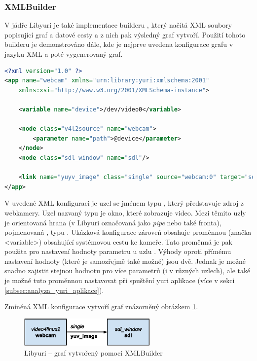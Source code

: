 \documentclass[thesis=M,czech]{FITthesis}[2012/06/26]
\begin{document}
\subsubsection{XMLBuilder} \label{subsec:analyza_yuri_vytvoreni_xml}
V jádře Libyuri je také implementace builderu , který načítá XML soubory popisující graf a datové cesty a z nich pak výsledný graf vytvoří. Použití tohoto builderu je demonstrováno dále, kde je nejprve uvedena konfigurace grafu v jazyku XML a poté vygenerovaný graf.
\\
\begin{minipage}{\linewidth}
\begin{lstlisting}[language=XML]
<?xml version="1.0" ?>
<app name="webcam" xmlns="urn:library:yuri:xmlschema:2001"
    xmlns:xsi="http://www.w3.org/2001/XMLSchema-instance">

    <variable name="device">/dev/video0</variable>    

    <node class="v4l2source" name="webcam">
        <parameter name="path">@device</parameter>
    </node>
    <node class="sdl_window" name="sdl"/>

    <link name="yuyv_image" class="single" source="webcam:0" target="sdl:0"/>
</app>
\end{lstlisting}
\end{minipage}
V uvedené XML konfiguraci je uzel se jménem  typu , který představuje zdroj z webkamery. Uzel nazvaný  typu  je okno, které zobrazuje video. Mezi těmito uzly je orientovaná hrana (v Libyuri označovaná jako \textit{pipe} nebo také fronta), pojmenovaná , typu . Ukázková konfigurace zároveň obsahuje proměnnou (značka <variable>) obsahující systémovou cestu ke kameře. Tato proměnná je pak použita pro nastavení hodnoty parametru  u uzlu . Výhody oproti přímému nastavení hodnoty (které je samozřejmě také možné) jsou dvě. Jednak je možné snadno zajistit stejnou hodnotu pro více parametrů (i v různých uzlech), ale také je možné tuto proměnnou nastavovat při spuštění yuri aplikace (více v sekci \ref{subsec:analyza_yuri_aplikace}). 

Zmíněná XML konfigurace vytvoří graf znázorněný obrázkem \ref{img:yuri_vytvoreni_xml}.
\\
\begin{figure}[h]\centering
	\includegraphics[width=0.6\textwidth]{images/yuri_xml_graph.eps}
	\caption{Libyuri -- graf vytvořený pomocí XMLBuilder}\label{img:yuri_vytvoreni_xml}
\end{figure}
\end{document}
